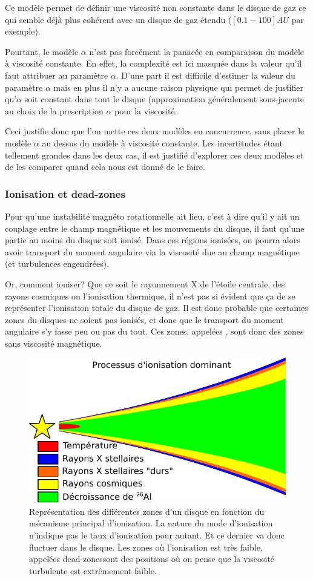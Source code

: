 Ce modèle permet de définir une viscosité non constante dans le disque de gaz ce qui semble déjà plus cohérent avec un disque de gaz étendu ($[0.1-100]\unit{AU}$ par exemple). 

Pourtant, le modèle $\alpha$ n'est pas forcément la panacée en comparaison du modèle à viscosité constante. En effet, la complexité est ici masquée dans la valeur qu'il faut attribuer au paramètre $\alpha$. D'une part il est difficile d'estimer la valeur du paramètre $\alpha$ mais en plus il n'y a aucune raison physique qui permet de justifier qu'$\alpha$ soit constant dans tout le disque (approximation généralement sous-jacente au choix de la prescription $\alpha$ pour la viscosité.

Ceci justifie donc que l'on mette ces deux modèles en concurrence, sans placer le modèle $\alpha$ au dessus du modèle à viscosité constante. Les incertitudes étant tellement grandes dans les deux cas, il est justifié d'explorer ces deux modèles et de les comparer quand cela nous est donné de le faire.

\subsubsection{Ionisation et dead-zones}
Pour qu'une instabilité magnéto rotationnelle ait lieu, c'est à dire qu'il y ait un couplage entre le champ magnétique et les mouvements du disque, il faut qu'une partie au moins du disque soit ionisé. Dans ces régions ionisées, on pourra alors avoir transport du moment angulaire via la viscosité due au champ magnétique (et turbulences engendrées). 

Or, comment ioniser? Que ce soit le rayonnement X de l'étoile centrale, des rayons cosmiques ou l'ionisation thermique, il n'est pas si évident que ça de se représenter l'ionisation totale du disque de gaz. Il est donc probable que certaines zones du disques ne soient pas ionisés, et donc que le transport du moment angulaire s'y fasse peu ou pas du tout. Ces zones, appelées , sont donc des zones sans viscosité magnétique. 

\begin{figure}[htb]
\centering
\includegraphics[width=0.7\linewidth]{figure/disk_ionization.pdf}
\caption{Représentation des différentes zones d'un disque en fonction du mécanisme principal d'ionisation. La nature du mode d'ionisation n'indique pas le taux d'ionisation pour autant. Et ce dernier va donc fluctuer dans le disque. Les zones où l'ionisation est très faible, appelées \og dead-zones\fg sont des positions où on pense que la viscosité turbulente est extrêmement faible.}\label{fig:ionization}
\end{figure}

